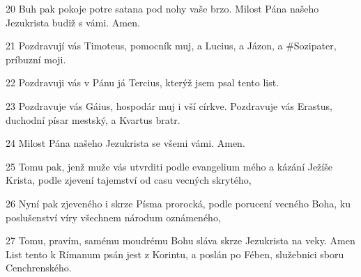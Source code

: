\par 20 Buh pak pokoje potre satana pod nohy vaše brzo. Milost Pána našeho Jezukrista budiž s vámi. Amen.
\par 21 Pozdravují vás Timoteus, pomocník muj, a Lucius, a Jázon, a #Sozipater, príbuzní moji.
\par 22 Pozdravuji vás v Pánu já Tercius, kterýž jsem psal tento list.
\par 23 Pozdravuje vás Gáius, hospodár muj i vší církve. Pozdravuje vás Erastus, duchodní písar mestský, a Kvartus bratr.
\par 24 Milost Pána našeho Jezukrista se všemi vámi. Amen.
\par 25 Tomu pak, jenž muže vás utvrditi podle evangelium mého a kázání Ježíše Krista, podle zjevení tajemství od casu vecných skrytého,
\par 26 Nyní pak zjeveného i skrze Písma prorocká, podle porucení vecného Boha, ku poslušenství víry všechnem národum oznámeného,
\par 27 Tomu, pravím, samému moudrému Bohu sláva skrze Jezukrista na veky. Amen List tento k Rímanum psán jest z Korintu, a poslán po Fében, služebnici sboru Cenchrenského.


